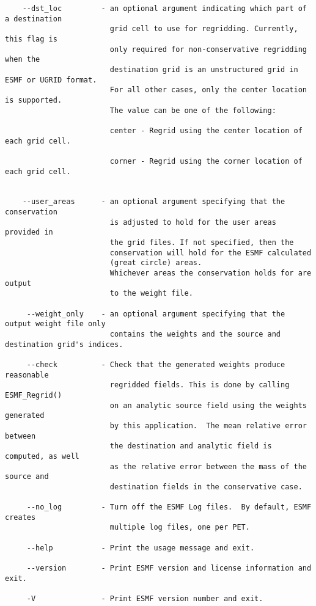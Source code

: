 \begin{verbatim}
    --dst_loc         - an optional argument indicating which part of a destination
                        grid cell to use for regridding. Currently, this flag is 
                        only required for non-conservative regridding when the 
                        destination grid is an unstructured grid in ESMF or UGRID format.
                        For all other cases, only the center location is supported.
                        The value can be one of the following:

                        center - Regrid using the center location of each grid cell.

                        corner - Regrid using the corner location of each grid cell.


    --user_areas      - an optional argument specifying that the conservation
                        is adjusted to hold for the user areas provided in
                        the grid files. If not specified, then the 
                        conservation will hold for the ESMF calculated 
                        (great circle) areas.
                        Whichever areas the conservation holds for are output
                        to the weight file.

     --weight_only    - an optional argument specifying that the output weight file only 
                        contains the weights and the source and destination grid's indices.

     --check          - Check that the generated weights produce reasonable 
                        regridded fields. This is done by calling ESMF_Regrid() 
                        on an analytic source field using the weights generated 
                        by this application.  The mean relative error between 
                        the destination and analytic field is computed, as well 
                        as the relative error between the mass of the source and 
                        destination fields in the conservative case.

     --no_log         - Turn off the ESMF Log files.  By default, ESMF creates 
                        multiple log files, one per PET.

     --help           - Print the usage message and exit.

     --version        - Print ESMF version and license information and exit.

     -V               - Print ESMF version number and exit.
\end{verbatim}


